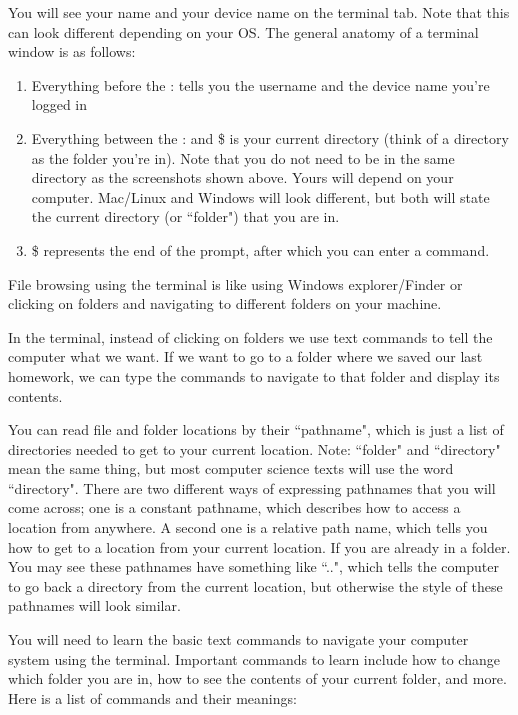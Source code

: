 You will see your name and your device name on the terminal tab. Note that this can look different depending on your OS. The general anatomy of a terminal window is as follows:

\begin{enumerate}
    \item Everything before the : tells you the username and the device name you’re logged in
    \item Everything between the : and \$ is your current directory (think of a directory as the folder you’re in). Note that you do not need to be in the same directory as the screenshots shown above. Yours will depend on your computer. Mac/Linux and Windows will look different, but both will state the current directory (or ``folder") that you are in.
    \item \$ represents the end of the prompt, after which you can enter a command.
\end{enumerate}


File browsing using the terminal is like using Windows explorer/Finder or clicking on folders and navigating to different folders on your machine.

In the terminal, instead of clicking on folders we use text commands to tell the computer what we want. If we want to go to a folder where we saved our last homework, we can type the commands to navigate to that folder and display its contents.

You can read file and folder locations by their ``pathname", which is just a list of directories needed to get to your current location. Note: ``folder" and ``directory" mean the same thing, but most computer science texts will use the word ``directory". There are two different ways of expressing pathnames that you will come across; one is a constant pathname, which describes how to access a location from anywhere. A second one is a relative path name, which tells you how to get to a location from your current location. If you are already in a folder. You may see these pathnames have something like ``..", which tells the computer to go back a directory from the current location, but otherwise the style of these pathnames will look similar. 

You will need to learn the basic text commands to navigate your computer system using the terminal. Important commands to learn include how to change which folder you are in, how to see the contents of your current folder, and more. Here is a list of commands and their meanings:

